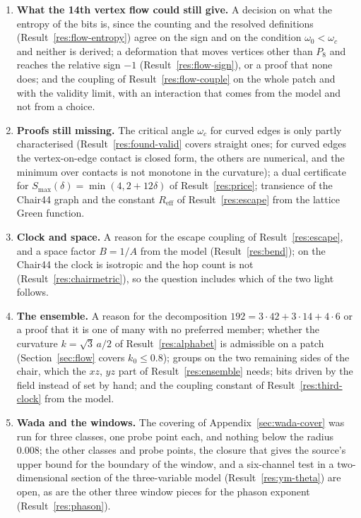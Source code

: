 \documentclass[11pt]{article}
\theoremstyle{definition}
\begin{document}
\begin{enumerate}[leftmargin=1.6em,itemsep=1pt]
\item\label{item:flow} \textbf{What the 14th vertex flow could still give.} A decision on what the entropy of the bits is, since the counting and the resolved definitions (Result~\ref{res:flow-entropy}) agree on the sign and on the condition $\omega_0<\omega_c$ and neither is derived; a deformation that moves vertices other than $P_8$ and reaches the relative sign $-1$ (Result~\ref{res:flow-sign}), or a proof that none does; and the coupling of Result~\ref{res:flow-couple} on the whole patch and with the validity limit, with an interaction that comes from the model and not from a choice.
\item\label{item:proofs} \textbf{Proofs still missing.} The critical angle $\omega_c$ for curved edges is only partly characterised (Result~\ref{res:found-valid} covers straight ones; for curved edges the vertex-on-edge contact is closed form, the others are numerical, and the minimum over contacts is not monotone in the curvature); a dual certificate for $S_{\max}(\delta)=\min(4,2+12\delta)$ of Result~\ref{res:price}; transience of the Chair44 graph and the constant $R_{\mathrm{eff}}$ of Result~\ref{res:escape} from the lattice Green function.
\item\label{item:density} \textbf{Clock and space.} A reason for the escape coupling of Result~\ref{res:escape}, and a space factor $B=1/A$ from the model (Result~\ref{res:bend}); on the Chair44 the clock is isotropic and the hop count is not (Result~\ref{res:chairmetric}), so the question includes which of the two light follows.
\item\label{item:ensemble} \textbf{The ensemble.} A reason for the decomposition $192=3\cdot42+3\cdot14+4\cdot6$ or a proof that it is one of many with no preferred member; whether the curvature $k=\sqrt3\,a/2$ of Result~\ref{res:alphabet} is admissible on a patch (Section~\ref{sec:flow} covers $k_0\le0.8$); groups on the two remaining sides of the chair, which the $xz$, $yz$ part of Result~\ref{res:ensemble} needs; bits driven by the field instead of set by hand; and the coupling constant of Result~\ref{res:third-clock} from the model.
\item\label{item:wada} \textbf{Wada and the windows.} The covering of Appendix~\ref{sec:wada-cover} was run for three classes, one probe point each, and nothing below the radius $0.008$; the other classes and probe points, the closure that gives the source's upper bound for the boundary of the window, and a six-channel test in a two-dimensional section of the three-variable model (Result~\ref{res:ym-theta}) are open, as are the other three window pieces for the phason exponent (Result~\ref{res:phason}).

\end{enumerate}
\end{document}
